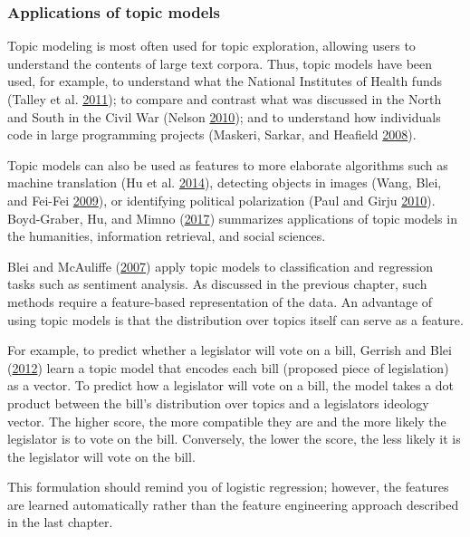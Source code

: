 \documentclass[]{krantz}
\begin{document}
\subsubsection{Applications of topic
models}\label{applications-of-topic-models}

Topic modeling is most often used for topic exploration, allowing users
to understand the contents of large text corpora. Thus, topic models
have been used, for example, to understand what the National Institutes
of Health funds (Talley et al.
\protect\hyperlink{ref-talley2011database}{2011}); to compare and
contrast what was discussed in the North and South in the Civil War
(Nelson \protect\hyperlink{ref-nelson-10}{2010}); and to understand how
individuals code in large programming projects (Maskeri, Sarkar, and
Heafield \protect\hyperlink{ref-maskeri-08}{2008}).

Topic models can also be used as features to more elaborate algorithms
such as machine translation (Hu et al.
\protect\hyperlink{ref-Hu:Zhai:Eidelman:Boyd-Graber-2014}{2014}),
detecting objects in images (Wang, Blei, and Fei-Fei
\protect\hyperlink{ref-wang-09b}{2009}), or identifying political
polarization (Paul and Girju \protect\hyperlink{ref-paul-10}{2010}).
Boyd-Graber, Hu, and Mimno
(\protect\hyperlink{ref-boyd-graber-17}{2017}) summarizes applications
of topic models in the humanities, information retrieval, and social
sciences.

Blei and McAuliffe (\protect\hyperlink{ref-blei-07b}{2007}) apply topic
models to classification and regression tasks such as sentiment
analysis. As discussed in the previous chapter, such methods require a
feature-based representation of the data. An advantage of using topic
models is that the distribution over topics itself can serve as a
feature.

For example, to predict whether a legislator will vote on a bill,
Gerrish and Blei (\protect\hyperlink{ref-gerrish-12}{2012}) learn a
topic model that encodes each bill (proposed piece of legislation) as a
vector. To predict how a legislator will vote on a bill, the model takes
a dot product between the bill's distribution over topics and a
legislators ideology vector. The higher score, the more compatible they
are and the more likely the legislator is to vote on the bill.
Conversely, the lower the score, the less likely it is the legislator
will vote on the bill.

This formulation should remind you of logistic regression; however, the
features are learned automatically rather than the feature engineering
approach described in the last chapter.
\end{document}

